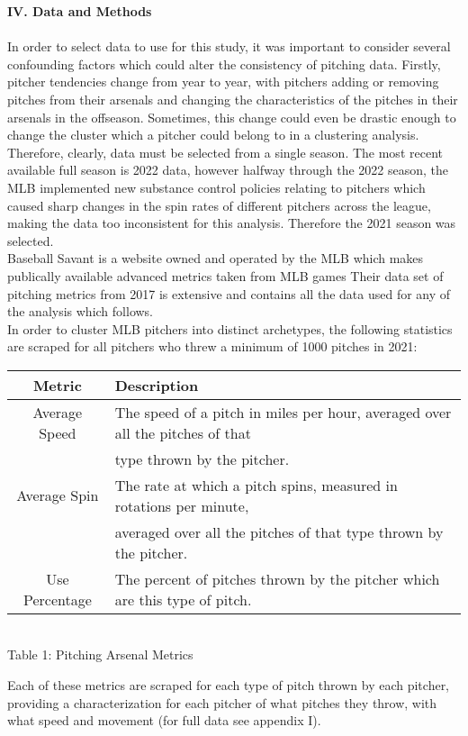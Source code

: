 \documentclass[12 pt]{article}
\begin{document}
\textbf{IV. Data and Methods} \\ \\
\indent In order to select data to use for this study, it was important to consider 
several confounding factors which could alter the consistency of pitching data. 
Firstly, pitcher tendencies change from year to year, with pitchers adding or removing 
pitches from their arsenals and changing the characteristics of the pitches in their 
arsenals in the offseason. Sometimes, this change could even be drastic enough to change the 
cluster which a pitcher could belong to in a clustering analysis. Therefore, clearly, 
data must be selected from a single season. The most recent available full season is 2022 data, however
halfway through the 2022 season, the MLB implemented new substance control policies 
relating to pitchers which caused sharp changes in the spin rates of different pitchers 
across the league, making the data too inconsistent for this analysis. Therefore the 2021 season was selected.
\\ \indent Baseball Savant is a website owned and operated by the MLB which makes 
publically available advanced metrics taken from MLB games Their data set of pitching 
metrics from 2017 is extensive and contains all the data used for any of the analysis which 
follows. 
\\ \indent In order to cluster MLB pitchers into distinct archetypes, the following 
statistics are scraped for all pitchers who threw a minimum of 1000 pitches in 2021:
\begin{center}
    \begin{tabular}{||c | l||} 
     \hline
     Metric & Description  \\ [0.5ex] 
     \hline
     Average Speed & The speed of a pitch in miles per hour, averaged over all the
     pitches of that \\ & type thrown by the pitcher. \\
     \hline
     Average Spin & The rate at which a pitch spins, measured in rotations per minute, \\
     & averaged over all the pitches of that type thrown by the pitcher. \\
     \hline
     Use Percentage & The percent of pitches thrown by the pitcher which are this type of pitch. \\
     \hline
    \end{tabular}
    \newline \\ Table 1: Pitching Arsenal Metrics
\end{center}
\indent Each of these metrics are scraped for each type of pitch thrown by each pitcher, 
providing a characterization for each pitcher of what pitches they throw, with what speed 
and movement (for full data see appendix I). \\
\end{document}
